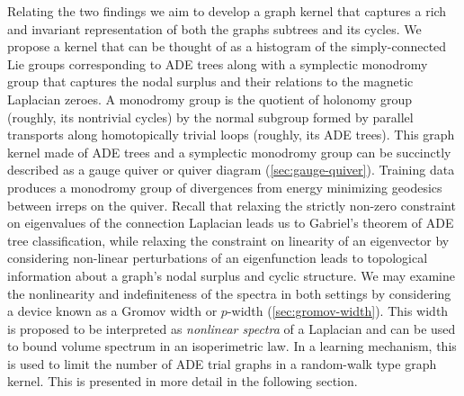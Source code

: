 \documentclass{article}
\theoremstyle{definition}
\begin{document}
Relating the two findings we aim to develop a graph kernel that captures a rich and invariant representation of both the graphs subtrees and its cycles.
We propose a kernel that can be thought of as a histogram of the simply-connected Lie groups corresponding to ADE trees along with a symplectic monodromy group that captures the nodal surplus and their relations to the magnetic Laplacian zeroes.
A monodromy group is the quotient of holonomy group (roughly, its nontrivial cycles) by the normal subgroup formed by parallel transports along homotopically trivial loops (roughly, its ADE trees).
This graph kernel made of ADE trees and a symplectic monodromy group can be succinctly described as a gauge quiver or quiver diagram (\cref{sec:gauge-quiver}).
Training data produces a monodromy group of divergences from energy minimizing geodesics between irreps on the quiver.
Recall that relaxing the strictly non-zero constraint on eigenvalues of the connection Laplacian leads us to Gabriel's theorem of ADE tree classification, while relaxing the constraint on linearity of an eigenvector by considering non-linear perturbations of an eigenfunction leads to topological information about a graph's nodal surplus and cyclic structure.
We may examine the nonlinearity and indefiniteness of the spectra in both settings by considering a device known as a Gromov width or $p$-width (\cref{sec:gromov-width}).
This width is proposed to be interpreted as \textit{nonlinear spectra} of a Laplacian and can be used to bound volume spectrum in an isoperimetric law.
In a learning mechanism, this is used to limit the number of ADE trial graphs in a random-walk type graph kernel. This is presented in more detail in the following section.
\end{document}
